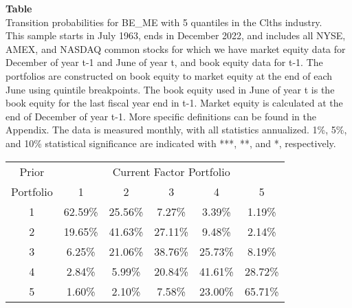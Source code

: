 \begin{table*}[ht!]
\raggedright
{}
\label{tab: transition_probs_BE_ME_Clths_with_5_quantiles}
\textbf{Table \thetable} \\
Transition probabilities for BE_ME with 5 quantiles in the Clths industry. \\
\hspace*{1em}This sample starts in July 1963, ends in December 2022, and includes all NYSE, AMEX, and NASDAQ common stocks for which we have market equity data for December of year t-1 and June of year t, and book equity data for t-1. The portfolios are constructed on book equity to market equity at the end of each June using quintile breakpoints.  The book equity used in June of year t is the book equity for the last fiscal year end in t-1.  Market equity is calculated at the end of December of year t-1.  More specific definitions can be found in the Appendix.  The data is measured monthly, with all statistics annualized.  1\%, 5\%, and 10\% statistical significance are indicated with ***, **, and *, respectively. \\
\vspace{0.5em}
\centering
\begin{adjustbox}{max width=\textwidth}
\begin{tabular}{@{}cccccc@{}}
\toprule
Prior & \multicolumn{5}{c}{Current Factor Portfolio} \\
Portfolio & 1 & 2 & 3 & 4 & 5 \\
\midrule
1 & 62.59\% & 25.56\% & 7.27\% & 3.39\% & 1.19\% \\
2 & 19.65\% & 41.63\% & 27.11\% & 9.48\% & 2.14\% \\
3 & 6.25\% & 21.06\% & 38.76\% & 25.73\% & 8.19\% \\
4 & 2.84\% & 5.99\% & 20.84\% & 41.61\% & 28.72\% \\
5 & 1.60\% & 2.10\% & 7.58\% & 23.00\% & 65.71\% \\
\bottomrule
\end{tabular}
\end{adjustbox}
\end{table*}